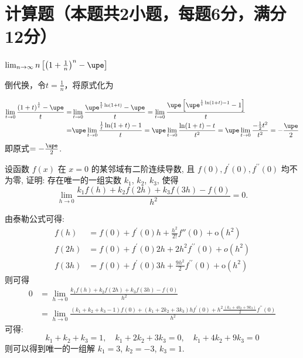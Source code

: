\documentclass{CWNUExam}
\begin{document}
\section{计算题（本题共2小题，每题6分，满分12分）}

\begin{problem}
  $\lim _{n \to \infty} n\left[\left(1+\frac{1}{n}\right)^{n}-\upe\right]$
\end{problem}

\begin{solution}
  倒代换，令$t=\frac{1}{n}$，将原式化为

  \begin{align*}
    \lim_{t \to 0} \frac{{{(1+t)}^{\frac{1}{t}}}- \upe }{t}
    = & \lim_{t \to 0} \frac{{{\upe}^{\frac{1}{t}\ln (1+t)}}- \upe }{t}
    =\lim_{t \to 0} \frac{ \upe \left[ {{\upe}^{\frac{1}{t}\ln (1+t)-1}}-1 \right]}{t} \\
    = & \upe \lim_{t \to 0} \frac{\frac{1}{t}\ln (1+t)-1}{t}
    = \upe \lim_{t \to 0} \frac{\ln (1+t)-t}{{{t}^{2}}}
    = \upe \lim_{t \to 0} \frac{-\frac{1}{2}t^2}{t^2}
    =-\frac{\upe}{2}
  \end{align*}
  即原式$=-\frac{\upe}{2}$.
\end{solution}

\begin{problem}
  设函数 $f(x)$ 在 $x=0$ 的某邻域有二阶连续导数, 且 $f(0), f^{\prime}(0), f^{\prime \prime}(0)$ 均不为零, 证明: 存在唯一的一组实数 $k_{1}$, $k_{2}$, $k_{3}$, 使得
  $$  \lim _{h \to 0} \frac{k_{1} f(h)+k_{2} f(2 h)+k_{3} f(3 h)-f(0)}{h^{2}}=0.  $$
\end{problem}

\begin{solution}
  由泰勒公式可得:
  \begin{align*}
    f(h)   & = f(0)+f^{\prime}(0) h+\frac{h^{2}}{2 !} f'' (0)+\mathrm{o}\left(h^{2}\right)                \\
    f(2 h) & = f(0)+f^{\prime}(0) 2 h+2 h^{2} f^{\prime \prime}(0)+o\left(h^{2}\right)                    \\
    f(3 h) & = f(0)+f^{\prime}(0) 3 h+\frac{9 h^{2}}{2} f^{\prime \prime}(0)+\mathrm{o}\left(h^{2}\right)
  \end{align*}
  则可得
  \begin{align*}
    0 & = \lim _{h \rightarrow 0} \frac{k_{1} f(h)+k_{2} f(2 h)+k_{3} f(3 h)-f(0)}{h^{2}}                                                                                                                       \\
      & =\lim _{h \rightarrow 0} \frac{\left(k_{1}+k_{2}+k_{3}-1\right) f(0)+\left(k_{1}+2 k_{2}+3 k_{3}\right) h f^{\prime}(0)+h^{2} \frac{\left(k_{1}+4 k_{2}+9 k_{3}\right)}{2} f^{\prime \prime}(0)}{h^{2}}
  \end{align*}
  可得:
  $$k_{1}+k_{2}+k_{3}=1, \quad k_{1}+2 k_{2}+3 k_{3}=0, \quad k_{1}+4 k_{2}+9 k_{3}=0$$
  则可以得到唯一的一组解 $k_{1}=3$, $k_{2}=-3$, $k_{3}=1$.
\end{solution}
\end{document}
